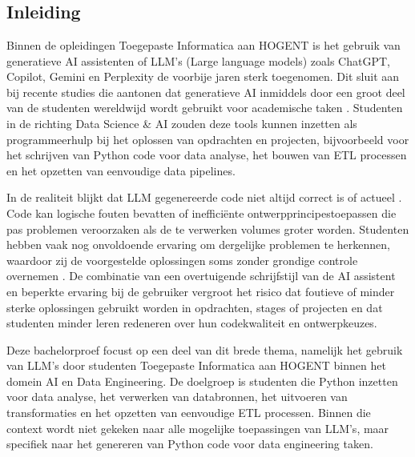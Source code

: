 
\chapter{}%
\label{ch:inleiding}


\section{Inleiding}%
\label{sec:inleiding}

Binnen de opleidingen Toegepaste Informatica aan HOGENT is het gebruik van generatieve AI assistenten of LLM's (Large language models) zoals ChatGPT, Copilot, Gemini en Perplexity de voorbije jaren sterk toegenomen. Dit sluit aan bij recente studies die aantonen dat generatieve AI inmiddels door een groot deel van de studenten wereldwijd wordt gebruikt voor academische taken \autocite{Amoah2025}. Studenten in de richting Data Science \& AI zouden deze tools kunnen inzetten als programmeerhulp bij het oplossen van opdrachten en projecten, bijvoorbeeld voor het schrijven van Python code voor data analyse, het bouwen van ETL processen en het opzetten van eenvoudige data pipelines.

In de realiteit blijkt dat LLM gegenereerde code niet altijd correct is of actueel \autocite{Tambon2024}. Code kan logische fouten bevatten of inefficiënte ontwerpprincipestoepassen die pas problemen veroorzaken als de te verwerken volumes groter worden. Studenten hebben vaak nog onvoldoende ervaring om dergelijke problemen te herkennen, waardoor zij de voorgestelde oplossingen soms zonder grondige controle overnemen \autocite{Oliveira2024}. De combinatie van een overtuigende schrijfstijl van de AI assistent en beperkte ervaring bij de gebruiker vergroot het risico dat foutieve of minder sterke oplossingen gebruikt worden in opdrachten, stages of projecten en dat studenten minder leren redeneren over hun codekwaliteit en ontwerpkeuzes.

Deze bachelorproef focust op een deel van dit brede thema, namelijk het gebruik van LLM’s door studenten Toegepaste Informatica aan HOGENT binnen het domein AI en Data Engineering. De doelgroep is studenten die Python inzetten voor data analyse, het verwerken van databronnen, het uitvoeren van transformaties en het opzetten van eenvoudige ETL processen. Binnen die context wordt niet gekeken naar alle mogelijke toepassingen van LLM’s, maar specifiek naar het genereren van Python code voor data engineering taken.


